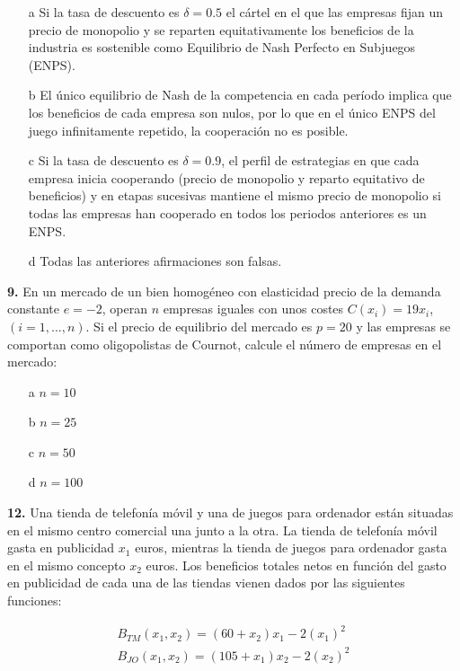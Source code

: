 \documentclass{nuevotema}
\begin{document}
\begin{itemize}
	\item[a] Si la tasa de descuento es $\delta = 0.5$ el cártel en el que las empresas fijan un precio de monopolio y se reparten equitativamente los beneficios de la industria es sostenible como Equilibrio de Nash Perfecto en Subjuegos (ENPS).
	\item[b] El único equilibrio de Nash de la competencia en cada período implica que los beneficios de cada empresa son nulos, por lo que en el único ENPS del juego infinitamente repetido, la cooperación no es posible.
	\item[c] Si la tasa de descuento es $\delta = 0.9$, el perfil de estrategias en que cada empresa inicia cooperando (precio de monopolio y reparto equitativo de beneficios) y en etapas sucesivas mantiene el mismo precio de monopolio si todas las empresas han cooperado en todos los periodos anteriores es un ENPS.
	\item[d] Todas las anteriores afirmaciones son falsas.
\end{itemize}

\textbf{9.} En un mercado de un bien homogéneo con elasticidad precio de la demanda constante $e=-2$, operan $n$ empresas iguales con unos costes $C(x_i) = 19x_i$, $(i=1,...,n)$. Si el precio de equilibrio del mercado es $p=20$ y las empresas se comportan como oligopolistas de Cournot, calcule el número de empresas en el mercado:

\begin{itemize}
	\item[a] $n=10$
	\item[b] $n=25$
	\item[c] $n=50$
	\item[d] $n=100$
\end{itemize}

\textbf{12.} Una tienda de telefonía móvil y una de juegos para ordenador están situadas en el mismo centro comercial una junto a la otra. La tienda de telefonía móvil gasta en publicidad $x_1$ euros, mientras la tienda de juegos para ordenador gasta en el mismo concepto $x_2$ euros. Los beneficios totales netos en función del gasto en publicidad de cada una de las tiendas vienen dados por las siguientes funciones:

\begin{align*}
	B_{TM} (x_1, x_2) = (60+x_2)x_1 - 2(x_1)^2 \\
	B_{JO}(x_1, x_2) = (105 + x_1) x_2 - 2 (x_2)^2
\end{align*}
\end{document}
